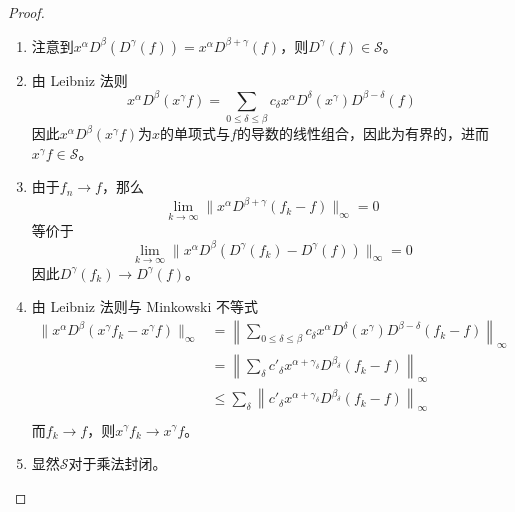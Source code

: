 \documentclass[lang = cn, %
scheme = chinese          %
]
{elegantbook}             %
\begin{document}
\begin{proof}
	\begin{enumerate}
		\item 注意到$x^\alpha D^\beta (D^\gamma (f))=x^\alpha D^{\beta+\gamma}(f)$，则$D^\gamma (f)\in \mathcal{S}$。
		\item 由 Leibniz 法则
		\[
		x^\alpha D^\beta(x^\gamma f)
		=\sum_{0\le\delta\le\beta}c_\delta x^\alpha D^\delta(x^\gamma)D^{\beta-\delta}(f)
		\]
		因此$x^\alpha D^\beta(x^\gamma f)$为$x$的单项式与$f$的导数的线性组合，因此为有界的，进而$x^\gamma f\in\mathcal{S}$。
		\item 由于$f_n\to f$，那么
		\[
		\lim_{k\to\infty}\|x^\alpha D^{\beta+\gamma}(f_k-f)\|_\infty=0
		\]
		等价于
		\[
		\lim_{k\to\infty}\|x^\alpha D^{\beta}(D^{\gamma}(f_k)-D^{\gamma}(f))\|_\infty=0
		\]
		因此$D^\gamma(f_k)\to D^\gamma(f)$。
		\item 由 Leibniz 法则与 Minkowski 不等式
		\begin{align*}
			\| x^\alpha D^\beta(x^\gamma f_k-x^\gamma f) \|_\infty
			& = \left\|\sum_{0\le\delta\le\beta}c_\delta x^\alpha D^\delta(x^\gamma)D^{\beta-\delta}(f_k-f) \right\|_\infty \\
			& = \left\|\sum_{\delta}c'_\delta x^{\alpha+\gamma_\delta}D^{\beta_\delta}(f_k-f) \right\|_\infty \\
			& \le \sum_{\delta}\left\|c'_\delta x^{\alpha+\gamma_\delta}D^{\beta_\delta}(f_k-f) \right\|_\infty \\
		\end{align*}
		而$f_k\to f$，则$x^\gamma f_k\to x^\gamma f$。
		\item 显然$\mathcal{S}$对于乘法封闭。
	\end{enumerate}
\end{proof}
\end{document}
